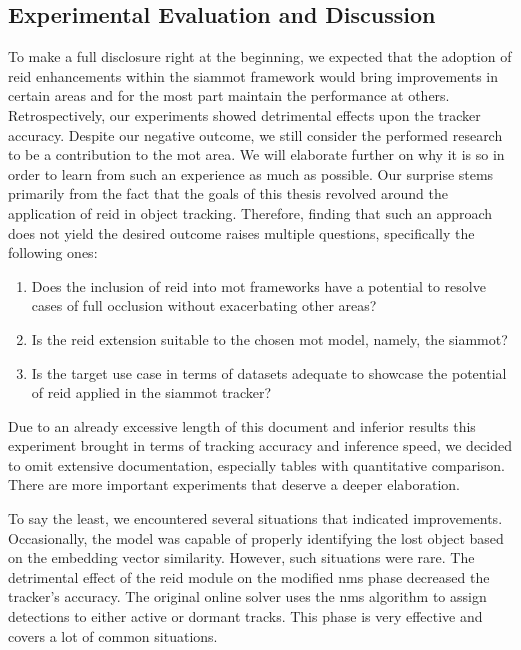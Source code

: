 \subsection{Experimental Evaluation and Discussion}

To make a full disclosure right at the beginning, we expected that the adoption of \gls{reid} enhancements within the \gls{siammot} framework would bring improvements in certain areas and for the most part maintain the performance at others. Retrospectively, our experiments showed detrimental effects upon the tracker accuracy. Despite our negative outcome, we still consider the performed research to be a contribution to the \gls{mot} area. We will elaborate further on why it is so in order to learn from such an experience as much as possible. Our surprise stems primarily from the fact that the goals of this thesis revolved around the application of \gls{reid} in object tracking. Therefore, finding that such an approach does not yield the desired outcome raises multiple questions, specifically the following ones:
\begin{enumerate}
    \item Does the inclusion of \gls{reid} into \gls{mot} frameworks have a potential to resolve cases of full occlusion without exacerbating other areas?
    \item Is the \gls{reid} extension suitable to the chosen \gls{mot} model, namely, the \gls{siammot}?
    \item Is the target use case in terms of datasets adequate to showcase the potential of \gls{reid} applied in the \gls{siammot} tracker?
\end{enumerate}

Due to an already excessive length of this document and inferior results this experiment brought in terms of tracking accuracy and inference speed, we decided to omit extensive documentation, especially tables with quantitative comparison. There are more important experiments that deserve a deeper elaboration.

To say the least, we encountered several situations that indicated improvements. Occasionally, the model was capable of properly identifying the lost object based on the embedding vector similarity. However, such situations were rare. The detrimental effect of the \gls{reid} module on the modified \gls{nms} phase decreased the tracker's accuracy. The original online solver uses the \gls{nms} algorithm to assign detections to either active or dormant tracks. This phase is very effective and covers a lot of common situations.

